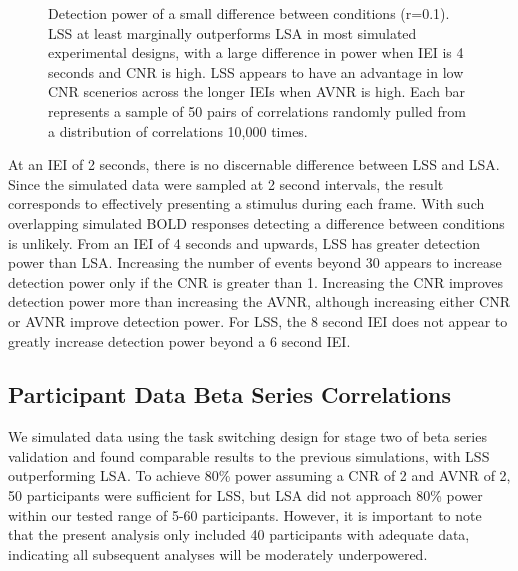 \documentclass[phd,appendix,figures]{uithesis}
\begin{document}
\begin{figure}[H]
  \centering


  \caption{
    Detection power of a small difference between conditions (r=0.1).
    LSS at least marginally outperforms LSA in most simulated experimental
    designs, with a large difference in power when IEI is 4 seconds and
    CNR is high.
    LSS appears to have an advantage in low CNR scenerios across the longer IEIs
    when AVNR is high.
    Each bar represents a sample of 50 pairs of correlations
    randomly pulled from a distribution of correlations 10,000 times.
  }
  \label{fig:res_sim_smalldiff}
\end{figure}

At an IEI of 2 seconds, there is no discernable difference between LSS and LSA.
Since the simulated data were sampled at 2 second intervals, the result
corresponds to effectively presenting a stimulus during each frame.
With such overlapping simulated BOLD responses detecting a difference between conditions
is unlikely.
From an IEI of 4 seconds and upwards, LSS has greater detection power than LSA.
Increasing the number of events beyond 30 appears to increase detection power only if the CNR is greater than 1.
Increasing the CNR improves detection power more than increasing the AVNR, although increasing either
CNR or AVNR improve detection power.
For LSS, the 8 second IEI does not appear to greatly increase detection power beyond a 6 second IEI.

\subsection*{Participant Data Beta Series Correlations}
\label{results:bsc-taskswitch}

We simulated data using the task switching design for stage two of beta series
validation and found comparable
results to the previous simulations, with LSS outperforming LSA.
To achieve 80\% power assuming a CNR of 2 and AVNR of 2, 50 participants were sufficient for LSS, but LSA
did not approach 80\% power within our tested range of 5-60 participants.
However, it is important to note that the present analysis only included 40 participants with adequate data,
indicating all subsequent analyses will be moderately underpowered.
\end{document}
